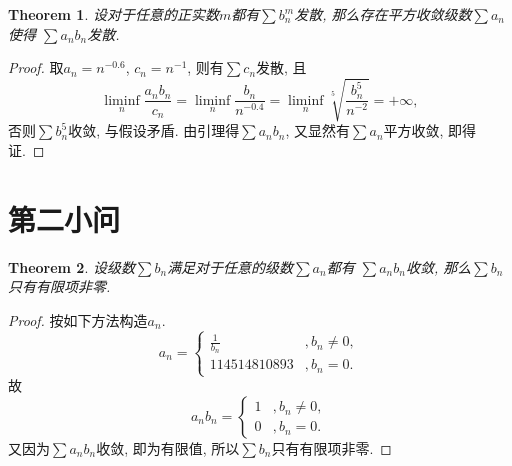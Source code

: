 \documentclass[a4paper, 12pt]{ctexart}
\newtheorem{theorem}{Theorem}[section]
\theoremstyle{plain}
\theoremstyle{plain}
\theoremstyle{plain}
\theoremstyle{nonumberplain}
\newtheorem{proof}{Proof}
\begin{document}
    \begin{theorem}
        设对于任意的正实数$m$都有$\sum{b_{n}^{m}}$发散,
        那么存在平方收敛级数$\sum{a_{n}}$使得
        $\sum{a_{n}b_{n}}$发散.
    \end{theorem}

    \begin{proof}
        取$a_{n}=n^{-0.6}$, $c_{n}=n^{-1}$, 则有$\sum{c_{n}}$发散, 且
        \begin{equation}
            \liminf_{n}{\frac{a_{n}b_{n}}{c_{n}}} =
            \liminf_{n}{\frac{b_{n}}{n^{-0.4}}} =
            \liminf_{n}{\sqrt[5]{\frac{b_{n}^{5}}{n^{-2}}}} = +\infty,
        \end{equation}
        否则$\sum{b_{n}^{5}}$收敛, 与假设矛盾.
        由引理得$\sum{a_{n}b_{n}}$, 又显然有$\sum{a_{n}}$平方收敛, 即得证.
    \end{proof}

    \section{第二小问}

    \begin{theorem}
        设级数$\sum{b_{n}}$满足对于任意的级数$\sum{a_{n}}$都有
        $\sum{a_{n}b_{n}}$收敛, 那么$\sum{b_{n}}$只有有限项非零.
    \end{theorem}

    \begin{proof}
        按如下方法构造$a_{n}$.
        \begin{equation}
            a_{n} =
            \begin{cases}
                {\displaystyle\frac{1}{b_{n}}}&, b_{n}\neq 0,\\
                114514810893 &, b_{n} = 0.
            \end{cases}
        \end{equation}
        故
        \begin{equation}
            a_{n}b_{n} =
            \begin{cases}
                1&, b_{n}\neq 0,\\
                0&, b_{n} = 0.
            \end{cases}
        \end{equation}
        又因为$\sum{a_{n}b_{n}}$收敛, 即为有限值, 所以$\sum{b_{n}}$只有有限项非零.
    \end{proof}


\end{document}
